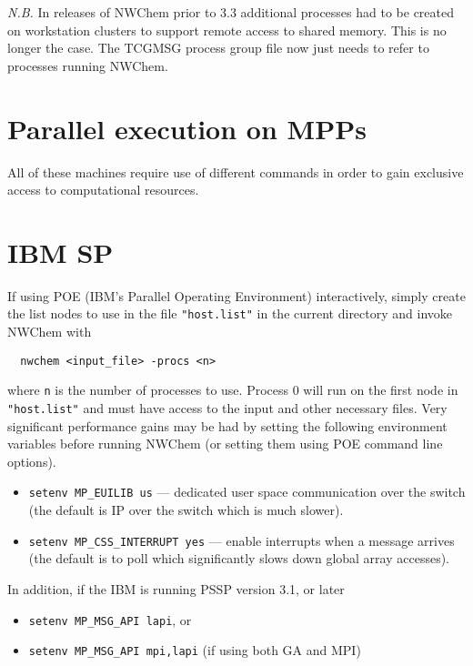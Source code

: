 {\em N.B.}  In releases of NWChem prior to 3.3 additional processes
had to be created on workstation clusters to support remote access to
shared memory.  This is no longer the case.  The TCGMSG process group
file now just needs to refer to processes running NWChem.

\section{Parallel execution on MPPs}

All of these machines require use of different commands in order to
gain exclusive access to computational resources.

\section{IBM SP}

If using POE (IBM's Parallel Operating Environment) interactively,
simply create the list nodes to use in the file \verb+"host.list"+ in
the current directory and invoke NWChem with
\begin{verbatim}
  nwchem <input_file> -procs <n>
\end{verbatim}
where \verb+n+ is the number of processes to use.  Process 0 will run
on the first node in \verb+"host.list"+ and must have access to the
input and other necessary files.  Very significant performance gains
may be had by setting the following environment variables before
running NWChem (or setting them using POE command line options).
\begin{itemize}
\item \verb+setenv MP_EUILIB us+ --- dedicated user space
  communication over the switch (the default is IP over the switch
  which is much slower).
\item \verb+setenv MP_CSS_INTERRUPT yes+ --- enable interrupts when a 
  message arrives (the default is to poll which significantly slows
  down global array accesses).
\end{itemize}
In addition, if the IBM is running PSSP version 3.1, or later
\begin{itemize}
\item \verb+setenv MP_MSG_API lapi+, or 
\item \verb+setenv MP_MSG_API mpi,lapi+ (if using both GA and MPI) 
\end{itemize}

